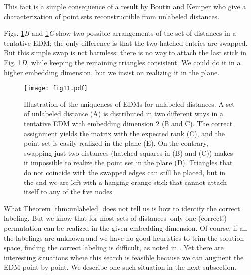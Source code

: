 \documentclass[10pt,double]{IEEEtran}
\begin{document}
This fact is a simple consequence of a result by Boutin and Kemper
\cite{Boutin:2004gb} who give a characterization of point sets reconstructible
from unlabeled distances.

Figs. \ref{fig:unlabeled_distances}\textsl{B} and
\ref{fig:unlabeled_distances}\textsl{C} show two possible arrangements of the
set of distances in a tentative EDM; the only difference is that the two
hatched entries are swapped. But this simple swap is not harmless: there is no
way to attach the last stick in Fig. \ref{fig:unlabeled_distances}\textsl{D},
while keeping the remaining triangles consistent. We could do it in a higher
embedding dimension, but we insist on realizing it in the plane.

\begin{figure}[t]
\centering
\texttt{[image: fig11.pdf]}
\caption{Illustration of the uniqueness of EDMs for unlabeled distances. A set
of unlabeled distance (A) is distributed in two different ways in a tentative
EDM with embedding dimension 2 (B and C). The correct assignment yields the
matrix with the expected rank (C), and the point set is easily realized in the
plane (E). On the contrary, swapping just two distances (hatched squares in
(B) and (C)) makes it impossible to realize the point set in the plane (D).
Triangles that do not coincide with the swapped edges can still be placed, but
in the end we are left with a hanging orange stick that cannot attach itself
to any of the five nodes.}
\label{fig:unlabeled_distances}
\end{figure}

What Theorem \ref{thm:unlabeled} does not tell us is how to identify the
correct labeling. But we know that for most sets of distances, only one
(correct!) permutation can be realized in the given embedding dimension. Of
course, if all the labelings are unknown and we have no good heuristics to
trim the solution space, finding the correct labeling is difficult, as noted
in \cite{Gujarathi:2014cz}. Yet there are interesting situations where this
search is feasible because we can augment the EDM point by point. We describe
one such situation in the next subsection.
\end{document}

